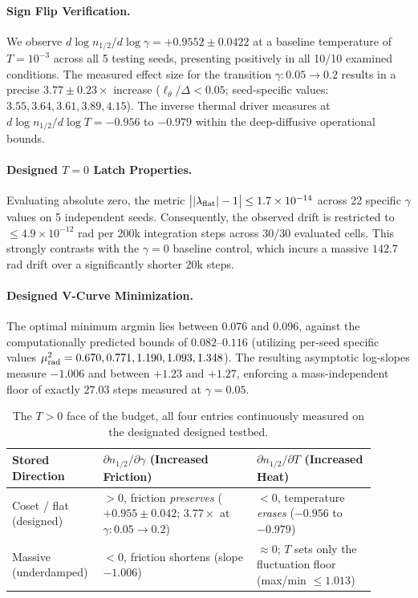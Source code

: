 \documentclass{article}
\begin{document}
\paragraph{Sign Flip Verification.} We observe $d\log n_{1/2}/d\log\gamma=+0.9552\pm0.0422$ at a baseline temperature of $T=10^{-3}$ across all 5 testing seeds, presenting positively in all 10/10 examined conditions. The measured effect size for the transition $\gamma:0.05\to0.2$ results in a precise $3.77\pm0.23\times$ increase ($\ell_\theta/\Delta<0.05$; seed-specific values: $3.55,3.64,3.61,3.89,4.15$). The inverse thermal driver measures at $d\log n_{1/2}/d\log T=-0.956$ to $-0.979$ within the deep-diffusive operational bounds.

\paragraph{Designed $T=0$ Latch Properties.} Evaluating absolute zero, the metric $\big||\lambda_{\rm flat}|-1\big|\le1.7\times10^{-14}$ across 22 specific $\gamma$ values on 5 independent seeds. Consequently, the observed drift is restricted to $\le4.9\times10^{-12}$ rad per 200k integration steps across 30/30 evaluated cells. This strongly contrasts with the $\gamma=0$ baseline control, which incurs a massive $142.7$ rad drift over a significantly shorter 20k steps.

\paragraph{Designed V-Curve Minimization.} The optimal minimum argmin lies between $0.076$ and $0.096$, against the computationally predicted bounds of $0.082$--$0.116$ (utilizing per-seed specific values $\mu^2_{\rm rad}=0.670,0.771,1.190,1.093,1.348$). The resulting asymptotic log-slopes measure $-1.006$ and between $+1.23$ and $+1.27$, enforcing a mass-independent floor of exactly $27.03$ steps measured at $\gamma=0.05$.

\begin{table}[!htb]\centering\small
\caption{The $T>0$ face of the budget, all four entries continuously measured on the designated designed testbed.}
\begin{tabular}{p{0.19\linewidth}p{0.40\linewidth}p{0.31\linewidth}}
\toprule
Stored Direction & $\partial n_{1/2}/\partial\gamma$ (Increased Friction) & $\partial n_{1/2}/\partial T$ (Increased Heat)\\
\midrule
Coset / flat (designed) & $>0$, friction \emph{preserves} ($+0.955\pm0.042$; $3.77\times$ at $\gamma:0.05\to0.2$) & $<0$, temperature \emph{erases} ($-0.956$ to $-0.979$)\\
\addlinespace
Massive (underdamped) & $<0$, friction shortens (slope $-1.006$) & $\approx0$; $T$ sets only the fluctuation floor (max/min $\le1.013$)\\
\bottomrule
\end{tabular}
\end{table}
\end{document}
